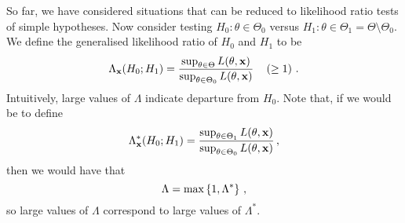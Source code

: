 So far, we have considered situations that can be reduced to likelihood ratio tests of simple hypotheses.
Now consider testing $H_0 : \theta \in \Theta_0$ versus $H_1 : \theta \in \Theta_1 = \Theta \setminus \Theta_0$.
We define the generalised likelihood ratio of $H_0$ and $H_1$ to be
\[
\Lambda_{\mathbf{x}} (H_0; H_1)  = \frac{\sup_{\theta \in \Theta} L(\theta, \mathbf{x})}{\sup_{\theta \in \Theta_0} L(\theta, \mathbf{x})} \quad \left(\geq 1\right) \, {.}
\]
Intuitively, large values of $\Lambda$ indicate departure from $H_0$.
Note that, if we would be to define
\[
\Lambda^*_{\mathbf{x}} (H_0; H_1)= \frac{\sup_{\theta \in \Theta_1} L(\theta, \mathbf{x})}{\sup_{\theta \in \Theta_0} L(\theta, \mathbf{x})} \, {,}
\]
then we would have that
\[
\Lambda = \max \left\{1, \Lambda^*\right\} \, {,}
\]
so large values of $\Lambda$ correspond to large values of $\Lambda^*$.


